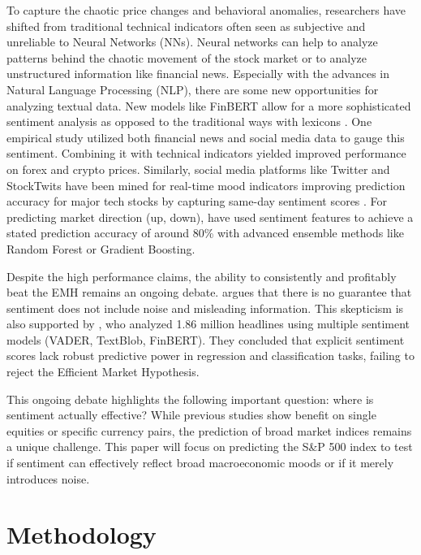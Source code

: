 \documentclass[Master,english,IEEE]{twbook}
\begin{document}
To capture the chaotic price changes and behavioral anomalies, researchers have shifted from traditional technical indicators often seen as subjective and unreliable \cite{lawrence1997using} to Neural Networks (NNs). Neural networks can help to analyze patterns behind the chaotic movement of the stock market \cite{ZHANG201860} or to analyze unstructured information like financial news. Especially with the advances in Natural Language Processing (NLP), there are some new opportunities for analyzing textual data. New models like FinBERT \cite{araci2019finbert} allow for a more sophisticated sentiment analysis as opposed to the traditional ways with lexicons \cite{loughran2011liability}. One empirical study \cite{ANBAEEFARIMANI2022108742} utilized both financial news and social media data to gauge this sentiment. Combining it with technical indicators yielded improved performance on forex and crypto prices. Similarly, social media platforms like Twitter and StockTwits have been mined for real-time mood indicators improving prediction accuracy for major tech stocks by capturing same-day sentiment scores \cite{9175549,sul2017trading}. For predicting market direction (up, down), \cite{CHOI2024121589,khan2022stock} have used sentiment features to achieve a stated prediction accuracy of around 80\% with advanced ensemble methods like Random Forest or Gradient Boosting.

Despite the high performance claims, the ability to consistently and profitably beat the EMH remains an ongoing debate. \cite{ZHANG201860} argues that there is no guarantee that sentiment does not include noise and misleading information. This skepticism is also supported by \cite{jrfm18080412}, who analyzed 1.86 million headlines using multiple sentiment models (VADER, TextBlob, FinBERT). They concluded that explicit sentiment scores lack robust predictive power in regression and classification tasks, failing to reject the Efficient Market Hypothesis.

This ongoing debate highlights the following important question: where is sentiment actually effective? While previous studies \cite{ANBAEEFARIMANI2022108742,9175549} show benefit on single equities or specific currency pairs, the prediction of broad market indices remains a unique challenge. This paper will focus on predicting the S\&P 500 index to test if sentiment can effectively reflect broad macroeconomic moods or if it merely introduces noise.

\chapter{Methodology}
\end{document}
